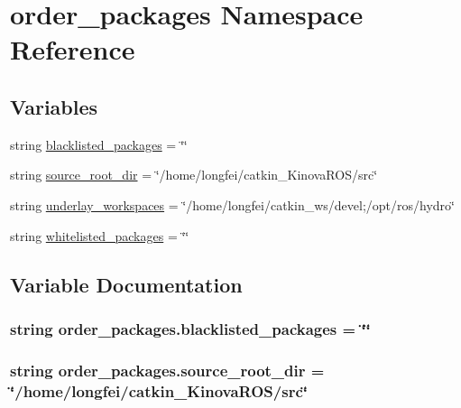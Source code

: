 \hypertarget{namespaceorder__packages}{}\section{order\+\_\+packages Namespace Reference}
\label{namespaceorder__packages}
\subsection*{Variables}
\begin{DoxyCompactItemize}
\item 
string \hyperlink{namespaceorder__packages_a29ea913f00c5a0e81d3c7688e7375507}{blacklisted\+\_\+packages} = \char`\"{}\char`\"{}
\item 
string \hyperlink{namespaceorder__packages_aff4fd297841de7fbddc2c0c33a6bab21}{source\+\_\+root\+\_\+dir} = \char`\"{}/home/longfei/catkin\+\_\+\+Kinova\+R\+OS/src\char`\"{}
\item 
string \hyperlink{namespaceorder__packages_a11d102ff09fd2977b9075c4c722015d2}{underlay\+\_\+workspaces} = \char`\"{}/home/longfei/catkin\+\_\+ws/devel;/opt/ros/hydro\char`\"{}
\item 
string \hyperlink{namespaceorder__packages_a84450a73e77dbf3689293b97dcb697a4}{whitelisted\+\_\+packages} = \char`\"{}\char`\"{}
\end{DoxyCompactItemize}


\subsection{Variable Documentation}
\subsubsection[{\texorpdfstring{blacklisted\+\_\+packages}{blacklisted_packages}}]{\setlength{\rightskip}{0pt plus 5cm}string order\+\_\+packages.\+blacklisted\+\_\+packages = \char`\"{}\char`\"{}}\hypertarget{namespaceorder__packages_a29ea913f00c5a0e81d3c7688e7375507}{}\label{namespaceorder__packages_a29ea913f00c5a0e81d3c7688e7375507}
\subsubsection[{\texorpdfstring{source\+\_\+root\+\_\+dir}{source_root_dir}}]{\setlength{\rightskip}{0pt plus 5cm}string order\+\_\+packages.\+source\+\_\+root\+\_\+dir = \char`\"{}/home/longfei/catkin\+\_\+\+Kinova\+R\+OS/src\char`\"{}}\hypertarget{namespaceorder__packages_aff4fd297841de7fbddc2c0c33a6bab21}{}\label{namespaceorder__packages_aff4fd297841de7fbddc2c0c33a6bab21}
